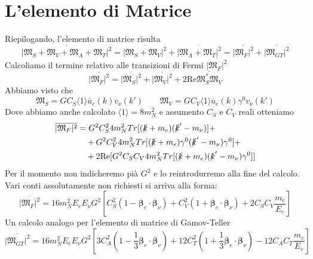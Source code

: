 \section{L'elemento di Matrice}
Riepilogando, l'elemento di matrice risulta
$$
\overline{|\mathfrak{M}_S + \mathfrak{M}_V + \mathfrak{M}_A + \mathfrak{M}_T|^2} = \overline{|\mathfrak{M}_S + \mathfrak{M}_V|^2} + \overline{|\mathfrak{M}_A + \mathfrak{M}_T|^2} = \overline{|\mathfrak{M}_F|^2} + \overline{|\mathfrak{M}_{GT}|^2}
$$
Calcoliamo il termine relativo alle transizioni di Fermi $\overline{|\mathfrak{M}_F|^2}$
$$
\overline{|\mathfrak{M}_F|^2} = \overline{|\mathfrak{M}_S|^2} + \overline{|\mathfrak{M}_V|^2} + 2 \text{Re} \overline{\mathfrak{M}_S^* \mathfrak{M}_V}
$$
Abbiamo visto che
$$
\mathfrak{M}_S = G C_S \langle 1 \rangle \overline{u}_e(k) v_\nu(k') \qquad \mathfrak{M}_V = G C_V \langle 1 \rangle \overline{u}_e(k) \gamma^0 v_\nu(k')
$$ 
Dove abbiamo anche calcolato $\langle1\rangle=8m_N^2$ e assumento $C_S$ e $C_V$ reali otteniamo
\begin{align*}
\overline{|\mathfrak{M}_F|^2} &= G^2 C_S^2 4m_N^2 Tr[(\slashed{k} + m_e)(\slashed{k}' - m_\nu)] + \\
&\quad + G^2 C_V^2 4m_N^2 Tr[(\slashed{k} + m_e)\gamma^0 (\slashed{k}' - m_\nu)\gamma^0] + \\
&\quad + 2\text{Re}[G^2 C_S C_V 4m_N^2 Tr[(\slashed{k} + m_e)(\slashed{k}' - m_\nu)\gamma^0]]
\end{align*}
Per il momento non indicheremo pià $G^2$ e lo reintrodurremo alla fine del calcolo. Vari conti assolutamente non richiesti si arriva alla forma:
$$
\overline{|\mathfrak{M}_F|^2} = 16m_N^2 E_e E_\nu G^2 \left[ C_S^2 (1 - \boldsymbol{\beta}_e \cdot \boldsymbol{\beta}_\nu) + C_V^2 (1 + \boldsymbol{\beta}_e \cdot \boldsymbol{\beta}_\nu) + 2C_S C_V \frac{m_e}{E_e} \right]
$$
Un calcolo analogo per l'elemento di matrice di Gamov-Teller
$$
\overline{|\mathfrak{M}_{GT}|^2} = 16m_N^2 E_e E_\nu G^2 \left[ 3C_A^2 \left(1 - \frac{1}{3}\boldsymbol{\beta}_e \cdot \boldsymbol{\beta}_\nu\right) + 12C_T^2 \left(1 + \frac{1}{3}\boldsymbol{\beta}_e \cdot \boldsymbol{\beta}_\nu\right) - 12C_A C_T \frac{m_e}{E_e} \right]
$$